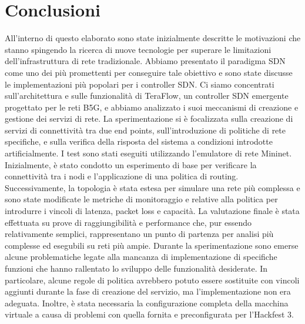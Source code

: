 \chapter{Conclusioni}
All'interno di questo elaborato sono state inizialmente descritte le motivazioni che stanno spingendo la ricerca di 
nuove tecnologie per superare le limitazioni dell'infrastruttura di rete tradizionale.
Abbiamo presentato il paradigma SDN come uno dei più promettenti per conseguire tale obiettivo e 
sono state discusse le implementazioni più popolari per i controller SDN. 
Ci siamo concentrati sull'architettura e sulle funzionalità di TeraFlow, un controller SDN emergente progettato per le reti B5G, e abbiamo analizzato i suoi meccanismi di creazione e gestione dei servizi di rete.
La sperimentazione si è focalizzata sulla creazione di servizi di connettività tra due end points, 
sull'introduzione di politiche di rete specifiche, e sulla verifica della risposta del sistema a condizioni introdotte artificialmente.
I test sono stati eseguiti utilizzando l'emulatore di rete Mininet.
Inizialmente, è stato condotto un esperimento di base per verificare la connettività tra i nodi e l'applicazione di una politica di routing. 
Successivamente, la topologia è stata estesa per simulare una rete più complessa
e sono state modificate le metriche di monitoraggio e relative alla politica per introdurre 
i vincoli di latenza, packet loss e capacità.
La valutazione finale è stata effettuata su prove di raggiungibilità e performance che, pur
essendo relativamente semplici, rappresentano un punto di partenza per analisi più complesse ed
esegubili su reti più ampie. 
\newline Durante la sperimentazione sono emerse alcune problematiche legate alla mancanza di implementazione
di specifiche funzioni che hanno rallentato lo sviluppo delle funzionalità desiderate.
In particolare, alcune regole di politica avrebbero potuto essere sostituite con vincoli aggiunti durante la fase di creazione del servizio,
ma l'implementazione non era adeguata. 
Inoltre, è stata necessaria la configurazione completa della macchina virtuale a causa di problemi con quella fornita e preconfigurata per l'Hackfest 3.
